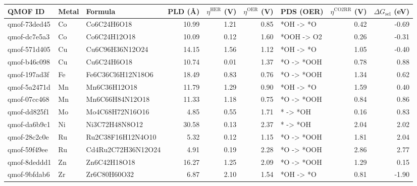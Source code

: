 \begin{tabular}{lllrrrlrr}
\toprule
QMOF ID & Metal & Formula & PLD (\AA) & $\eta^{\mathrm{HER}}$ (V) & $\eta^{\mathrm{OER}}$ (V) & PDS (OER) & $\eta^{\mathrm{CO2RR}}$ (V) & $\Delta G_{\mathrm{sel}}$ (eV) \\
\midrule
qmof-73ded45 & Co & Co6C24H6O18 & 10.99 & 1.21 & 0.85 & *OH -> *O & 0.42 & -0.69 \\
qmof-dc7e5a3 & Co & Co6C24H12O18 & 10.09 & 0.12 & 1.60 & *OOH -> O2 & 0.26 & -0.31 \\
qmof-571d405 & Cu & Cu6C96H36N12O24 & 14.15 & 1.56 & 1.12 & *OH -> *O & 1.05 & -0.40 \\
qmof-b46c098 & Cu & Cu6C24H6O18 & 10.74 & 0.01 & 1.37 & *O -> *OOH & 0.78 & 0.88 \\
qmof-197ad3f & Fe & Fe6C36Cl6H12N18O6 & 18.49 & 0.83 & 0.76 & *O -> *OOH & 1.34 & 0.62 \\
qmof-5a2471d & Mn & Mn6C36H12O18 & 11.79 & 1.29 & 0.90 & *OH -> *O & 1.59 & 0.40 \\
qmof-07cc468 & Mn & Mn6C66H84N12O18 & 11.33 & 1.18 & 0.75 & *O -> *OOH & 0.84 & 0.86 \\
qmof-dd825f1 & Mo & Mo4C68H72N16O16 & 4.85 & 0.55 & 1.71 & * -> *OH & 0.16 & 0.83 \\
qmof-da6b9c1 & Ni & Ni3C72H48N8O12 & 30.58 & 0.13 & 2.37 & * -> *OH & 2.04 & 2.02 \\
qmof-28c2c0e & Ru & Ru2C38F16H12N4O10 & 5.32 & 0.12 & 1.15 & *O -> *OOH & 1.81 & 2.04 \\
qmof-59f49ee & Ru & Cd4Ru2C72H36N12O24 & 4.91 & 0.19 & 2.28 & *O -> *OOH & 2.86 & 2.77 \\
qmof-8deddd1 & Zn & Zn6C42H18O18 & 16.27 & 1.25 & 2.09 & *O -> *OOH & 1.29 & 0.15 \\
qmof-9bfdab6 & Zr & Zr6C80H60O32 & 6.87 & 2.10 & 1.54 & *OH -> *O & 0.81 & -1.90 \\
\bottomrule
\end{tabular}
